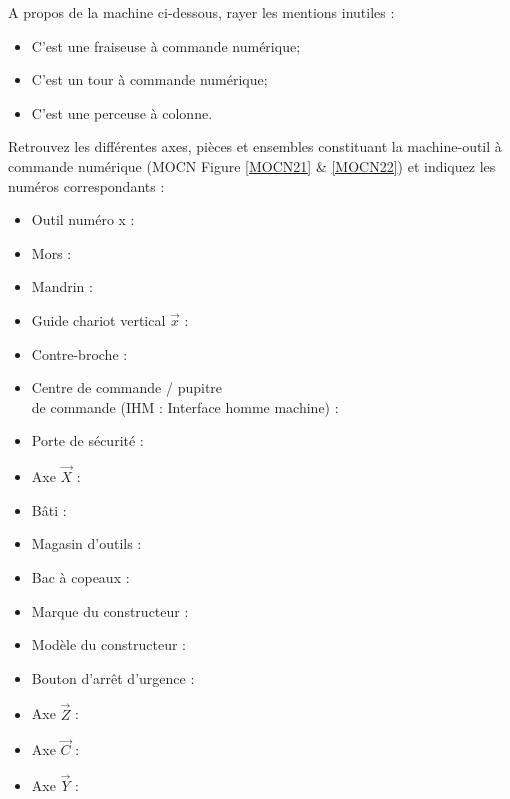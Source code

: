\documentclass[12pt]{article}
\newcounter{exo}
\newenvironment{exo}{\stepcounter{exo}\vspace{0.5cm}{\bfseries Question \theexo\ :}}{\par\vspace{0.5cm}}
\begin{document}
\begin{exo}\label{exo1} A propos de la machine ci-dessous, rayer les mentions inutiles :
\begin{itemize}
    \item C'est une fraiseuse à commande numérique;
    \item C'est un tour à commande numérique;
    \item C'est une perceuse à colonne.
\end{itemize}
\end{exo}


\begin{exo}\label{exo1} Retrouvez les différentes axes, pièces et ensembles constituant la machine-outil à commande numérique (MOCN Figure \ref{MOCN21} \& \ref{MOCN22}) et indiquez les numéros correspondants :\\ \end{exo}
\begin{minipage}{.55\linewidth}
\begin{itemize}
    \item Outil numéro x :
    \item Mors :
    \item Mandrin :
    \item Guide chariot vertical $\overrightarrow{x}$ :
    \item Contre-broche :
    \item Centre de commande / pupitre\\ de commande (IHM : Interface homme machine) :
    \item Porte de sécurité :
    \item Axe $\overrightarrow{X}$ :
    \item Bâti :
\end{itemize}


\end{minipage}
\begin{minipage}{.44\linewidth}
\begin{itemize}
    \item Magasin d’outils :
    \item Bac à copeaux :
    \item Marque du constructeur :
    \item Modèle du constructeur :
    \item Bouton d'arrêt d’urgence :
    \item Axe $\overrightarrow{Z}$ :
    \item Axe $\overrightarrow{C}$ :
    \item Axe $\overrightarrow{Y}$ :
\end{itemize}
\end{minipage}
\end{document}
